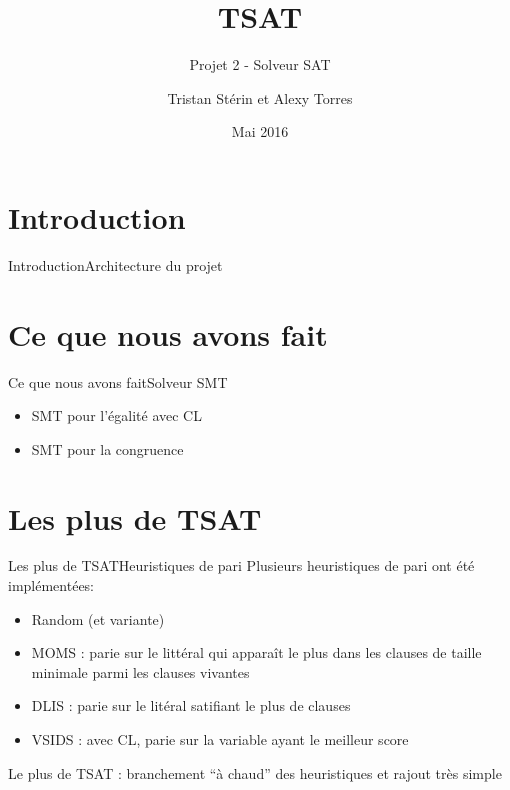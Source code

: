 \documentclass{beamer}
\title{TSAT}
\subtitle{Projet 2 - Solveur SAT}
\author{Tristan Stérin et Alexy Torres}
\institute{ENS Lyon}
\date{Mai 2016}
\begin{document}
    \begin{frame}
        \titlepage
    \end{frame}
    
    \frame{\tableofcontents}

    \section{Introduction}
        \begin{frame}{Introduction}{Architecture du projet}
        \end{frame}
        
    \section{Ce que nous avons fait}

        \begin{frame}{Ce que nous avons fait}{Solveur SMT}
            \begin{itemize}
                \item SMT pour l'égalité avec CL
                \item SMT pour la congruence
            \end{itemize}
        \end{frame}

    \section{Les plus de TSAT}
        \begin{frame}{Les plus de TSAT}{Heuristiques de pari}
            Plusieurs heuristiques de pari ont été implémentées:
            \begin{itemize}
                \item Random (et variante)
                \item MOMS : parie sur le littéral qui apparaît le plus dans les clauses de taille minimale parmi les clauses vivantes
                \item DLIS : parie sur le litéral satifiant le plus de clauses
                \item VSIDS : avec CL, parie sur la variable ayant le meilleur score
            \end{itemize}
            \vspace{0.5cm}
            Le plus de TSAT : branchement ``à chaud'' des heuristiques et rajout très simple
        \end{frame}
\end{document}
